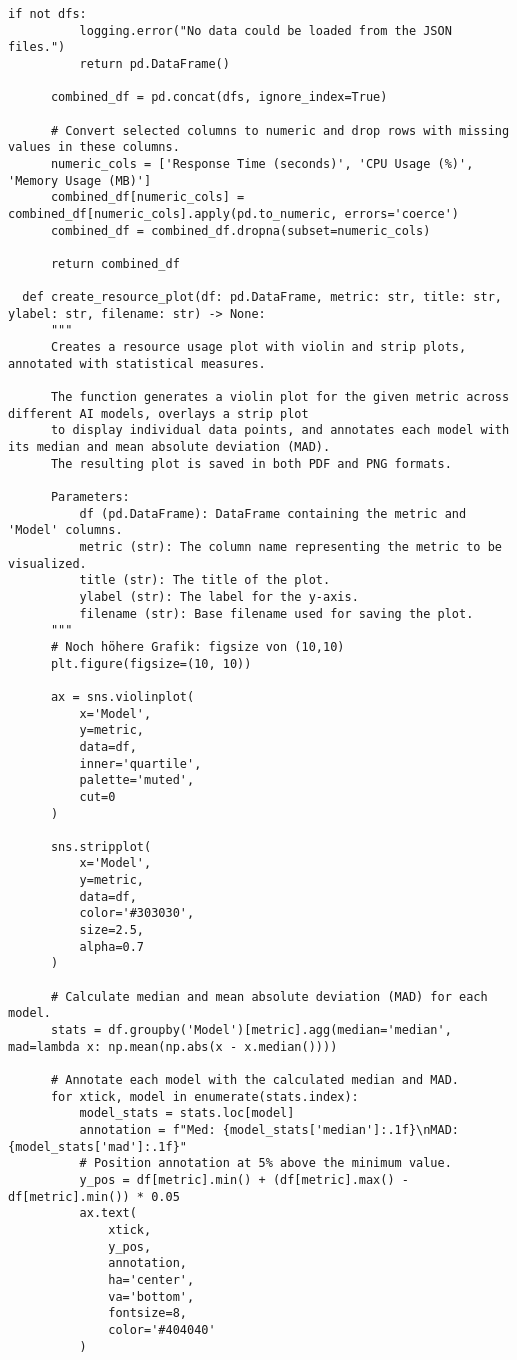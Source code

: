 \begin{lstlisting}[style=Python, caption={Python-quantitative-data-analysis}, captionpos=b]
      if not dfs:
          logging.error("No data could be loaded from the JSON files.")
          return pd.DataFrame()
      
      combined_df = pd.concat(dfs, ignore_index=True)
      
      # Convert selected columns to numeric and drop rows with missing values in these columns.
      numeric_cols = ['Response Time (seconds)', 'CPU Usage (%)', 'Memory Usage (MB)']
      combined_df[numeric_cols] = combined_df[numeric_cols].apply(pd.to_numeric, errors='coerce')
      combined_df = combined_df.dropna(subset=numeric_cols)
      
      return combined_df
  
  def create_resource_plot(df: pd.DataFrame, metric: str, title: str, ylabel: str, filename: str) -> None:
      """
      Creates a resource usage plot with violin and strip plots, annotated with statistical measures.
      
      The function generates a violin plot for the given metric across different AI models, overlays a strip plot
      to display individual data points, and annotates each model with its median and mean absolute deviation (MAD).
      The resulting plot is saved in both PDF and PNG formats.
      
      Parameters:
          df (pd.DataFrame): DataFrame containing the metric and 'Model' columns.
          metric (str): The column name representing the metric to be visualized.
          title (str): The title of the plot.
          ylabel (str): The label for the y-axis.
          filename (str): Base filename used for saving the plot.
      """
      # Noch höhere Grafik: figsize von (10,10)
      plt.figure(figsize=(10, 10))
      
      ax = sns.violinplot(
          x='Model',
          y=metric,
          data=df,
          inner='quartile',
          palette='muted',
          cut=0
      )
      
      sns.stripplot(
          x='Model',
          y=metric,
          data=df,
          color='#303030',
          size=2.5,
          alpha=0.7
      )
      
      # Calculate median and mean absolute deviation (MAD) for each model.
      stats = df.groupby('Model')[metric].agg(median='median', mad=lambda x: np.mean(np.abs(x - x.median())))
      
      # Annotate each model with the calculated median and MAD.
      for xtick, model in enumerate(stats.index):
          model_stats = stats.loc[model]
          annotation = f"Med: {model_stats['median']:.1f}\nMAD: {model_stats['mad']:.1f}"
          # Position annotation at 5% above the minimum value.
          y_pos = df[metric].min() + (df[metric].max() - df[metric].min()) * 0.05
          ax.text(
              xtick,
              y_pos,
              annotation,
              ha='center',
              va='bottom',
              fontsize=8,
              color='#404040'
          )
      

\end{lstlisting}
